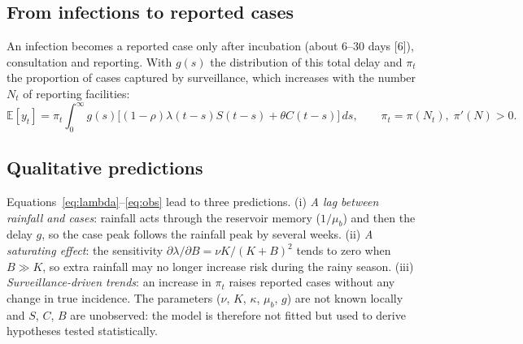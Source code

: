 \documentclass[11pt]{article}
\begin{document}
\subsection{From infections to reported cases}
An infection becomes a reported case only after incubation (about 6–30 days [6]), consultation and reporting. With $g(s)$ the distribution of this total delay and $\pi_t$ the proportion of cases captured by surveillance, which increases with the number $N_t$ of reporting facilities:
\begin{equation}
\mathbb{E}[y_t]=\pi_t\int_0^{\infty}g(s)\big[(1-\rho)\lambda(t-s)S(t-s)+\theta C(t-s)\big]\,ds,\qquad \pi_t=\pi(N_t),\;\pi'(N)>0 .
\label{eq:obs}
\end{equation}

\subsection{Qualitative predictions}
Equations~\eqref{eq:lambda}–\eqref{eq:obs} lead to three predictions. (i) \textit{A lag between rainfall and cases}: rainfall acts through the reservoir memory ($1/\mu_b$) and then the delay $g$, so the case peak follows the rainfall peak by several weeks. (ii) \textit{A saturating effect}: the sensitivity $\partial\lambda/\partial B=\nu K/(K+B)^2$ tends to zero when $B\gg K$, so extra rainfall may no longer increase risk during the rainy season. (iii) \textit{Surveillance-driven trends}: an increase in $\pi_t$ raises reported cases without any change in true incidence. The parameters ($\nu$, $K$, $\kappa$, $\mu_b$, $g$) are not known locally and $S$, $C$, $B$ are unobserved: the model is therefore not fitted but used to derive hypotheses tested statistically.
\end{document}
